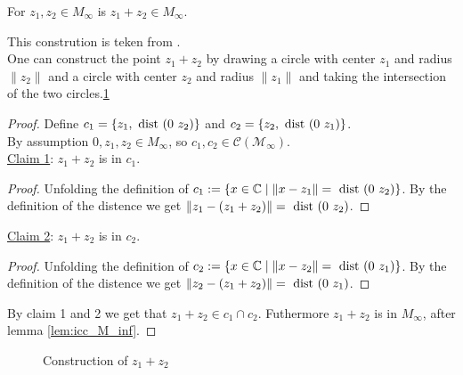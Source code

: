 \begin{lemma}
    \label{lem:construction_add}
    \leanok
    For $z_1, z_2 \in M_{\infty}$ is $z_1 + z_2 \in M_{\infty}$.
\end{lemma}
This constrution is teken from \cite{JAN_SCHRÖER:2023}.\\
One can construct the point $z_1 + z_2$ by drawing a circle with center $z_1$ and radius $\|z_2\|$ and a circle with center $z_2$ and radius $\|z_1\|$ and taking the intersection of the two circles.\ref{Fig.2}
\begin{proof}
    Define $c_1 = \{z_1,\text{ dist } (0\ z_2)\}$ and $c_2 = \{z_2,\dist (0\ z_1)\}$.\\
    By assumption $0, z_1, z_2 \in M_{\infty}$, so $c_1, c_2 \in \mathcal{C(M_{\infty})}$.\\
    \underline{Claim 1}: $z_1 + z_2$ is in $c_1$.
    \begin{proof}
        Unfolding the definition of $c_1:=\{x\in\mathbb{C} \mid\|x-z_1\|=\dist (0\ z_2)\}$.
        By the definition of the distence we get $\|z_1-(z_1+z_2)\| = \text{ dist } (0\ z_2)$.
    \end{proof}
    \underline{Claim 2}: $z_1 + z_2$ is in $c_2$.
    \begin{proof}
        Unfolding the definition of $c_2:=\{x\in\mathbb{C} \mid\|x-z_2\|=\dist (0\ z_1)\}$.
        By the definition of the distence we get $\|z_2-(z_1+z_2)\| = \text{ dist } (0\ z_1)$.
    \end{proof}
    By claim 1 and 2 we get that $z_1 + z_2 \in c_1 \cap c_2$. Futhermore  $z_1 + z_2 $ is in $M_{\infty}$, after lemma \ref{lem:icc_M_inf}.
\end{proof}
\begin{figure}[h]
    \centering
    \caption{Construction of $z_1 + z_2$}
    \label{Fig.2}
\end{figure}

